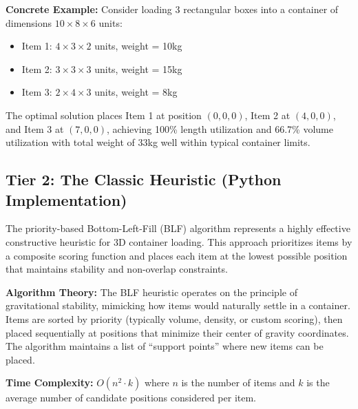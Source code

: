 \documentclass{article}
\begin{document}
\textbf{Concrete Example:} Consider loading 3 rectangular boxes into a container of dimensions $10 \times 8 \times 6$ units:
\begin{itemize}
\item Item 1: $4 \times 3 \times 2$ units, weight = 10kg
\item Item 2: $3 \times 3 \times 3$ units, weight = 15kg  
\item Item 3: $2 \times 4 \times 3$ units, weight = 8kg
\end{itemize}

The optimal solution places Item 1 at position $(0,0,0)$, Item 2 at $(4,0,0)$, and Item 3 at $(7,0,0)$, achieving 100\% length utilization and 66.7\% volume utilization with total weight of 33kg well within typical container limits.

\subsection{Tier 2: The Classic Heuristic (Python Implementation)}

The priority-based Bottom-Left-Fill (BLF) algorithm represents a highly effective constructive heuristic for 3D container loading. This approach prioritizes items by a composite scoring function and places each item at the lowest possible position that maintains stability and non-overlap constraints.

\textbf{Algorithm Theory:}
The BLF heuristic operates on the principle of gravitational stability, mimicking how items would naturally settle in a container. Items are sorted by priority (typically volume, density, or custom scoring), then placed sequentially at positions that minimize their center of gravity coordinates. The algorithm maintains a list of ``support points'' where new items can be placed.

\textbf{Time Complexity:} $O(n^2 \cdot k)$ where $n$ is the number of items and $k$ is the average number of candidate positions considered per item.
\end{document}
